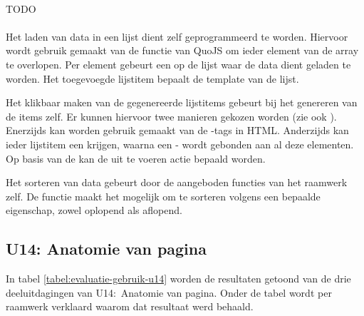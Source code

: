 \paragraph{\kendo}
TODO

\paragraph{\lungo}
Het laden van data in een lijst dient zelf geprogrammeerd te worden.
Hiervoor wordt gebruik gemaakt van de functie  van QuoJS om ieder element van de array te overlopen.
Per element gebeurt een  op de lijst waar de data dient geladen te worden.
Het toegevoegde lijstitem bepaalt de template van de lijst.

Het klikbaar maken van de gegenereerde lijstitems gebeurt bij het genereren van de items zelf.
Er kunnen hiervoor twee manieren gekozen worden (zie ook \jqm{}).
Enerzijds kan worden gebruik gemaakt van de -tags in HTML.
Anderzijds kan ieder lijstitem een  krijgen, waarna een -  wordt gebonden aan al deze elementen.
Op basis van de  kan de uit te voeren actie bepaald worden.

Het sorteren van data gebeurt door de aangeboden functies van het raamwerk zelf.
De functie  maakt het mogelijk om te sorteren volgens een bepaalde eigenschap, zowel oplopend als aflopend.


\subsection{U14: Anatomie van pagina}
In tabel \ref{tabel:evaluatie-gebruik-u14} worden de resultaten getoond van de drie deeluitdagingen van U14:~Anatomie van pagina.
Onder de tabel wordt per raamwerk verklaard waarom dat resultaat werd behaald.

\begin{table}[H]
\centering
{}
\caption{Gebruik voor U14: Anatomie van pagina}
\label{tabel:evaluatie-gebruik-u14}
\end{table}

